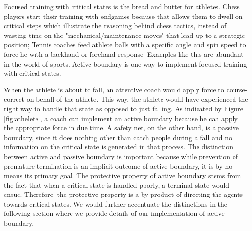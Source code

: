\documentclass[journal]{IEEEtran}
\begin{document}
Focused training with critical states is the bread and butter for athletes. Chess players start their training with endgames because that allows them to dwell on critical steps which illustrate the reasoning behind chess tactics, instead of wasting time on the "mechanical/maintenance moves" that lead up to a strategic position; Tennis coaches feed athlete balls with a specific angle and spin speed to force he with a backhand or forehand response. Examples like this are abundant in the world of sports. Active boundary is one way to implement focused training with critical states. 

When the athlete is about to fall, an attentive coach would apply force to course-correct on behalf of the athlete. This way, the athlete would have experienced the right way to handle that state as opposed to just falling. As indicated by Figure \ref{fig:athelete}, a coach can implement an active boundary because he can apply the appropriate force in due time. A safety net, on the other hand, is a passive boundary, since it does nothing other than catch people during a fall and no information on the critical state is generated in that process. The distinction between active and passive boundary is important because while prevention of premature termination is an implicit outcome of active boundary, it is by no means its primary goal. The protective property of active boundary stems from the fact that when a critical state is handled poorly, a terminal state would ensue. Therefore, the protective property is a by-product of directing the agents towards critical states. We would further accentuate the distinctions in the following section where we provide details of our implementation of active boundary. 
\end{document}
